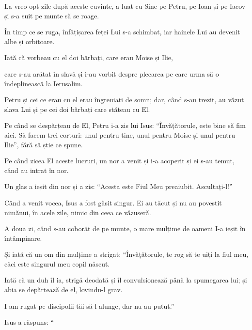 {


\par }{\PP {}La vreo opt zile după aceste cuvinte, a luat cu Sine pe Petru, pe Ioan și pe Iacov și s-a suit pe munte să se roage.

În timp ce se ruga, înfățișarea feței Lui s-a schimbat, iar hainele Lui au devenit albe și orbitoare.

Iată că vorbeau cu el doi bărbați, care erau Moise și Ilie,

care s-au arătat în slavă și i-au vorbit despre plecarea pe care urma să o îndeplinească la Ierusalim.


\par }{\PP {}Petru și cei ce erau cu el erau îngreuiați de somn; dar, când s-au trezit, au văzut slava Lui și pe cei doi bărbați care stăteau cu El.

Pe când se despărțeau de El, Petru i-a zis lui Isus: “Învățătorule, este bine să fim aici. Să facem trei corturi: unul pentru tine, unul pentru Moise și unul pentru Ilie”, fără să știe ce spune.


\par }{\PP {}Pe când zicea El aceste lucruri, un nor a venit și i-a acoperit și ei s-au temut, când au intrat în nor.

Un glas a ieșit din nor și a zis: “Acesta este Fiul Meu preaiubit. Ascultați-l!”

Când a venit vocea, Isus a fost găsit singur. Ei au tăcut și nu au povestit nimănui, în acele zile, nimic din ceea ce văzuseră.


\par }{\PP {}A doua zi, când s-au coborât de pe munte, o mare mulțime de oameni I-a ieșit în întâmpinare.

Și iată că un om din mulțime a strigat: “Învățătorule, te rog să te uiți la fiul meu, căci este singurul meu copil născut.

Iată că un duh îl ia, strigă deodată și îl convulsionează până la spumegarea lui; și abia se depărtează de el, lovindu-l grav.

I-am rugat pe discipolii tăi să-l alunge, dar nu au putut.”


\par }{\PP {}Isus a răspuns: “{}


}
